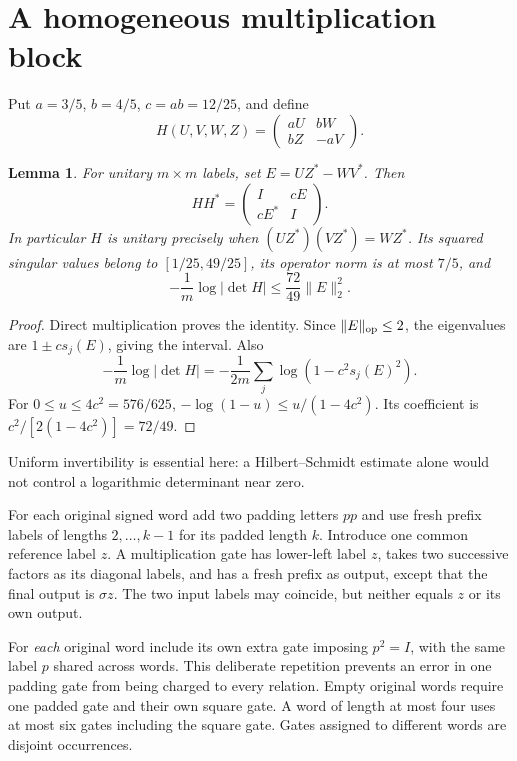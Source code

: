 \documentclass[11pt,a4paper]{article}
\newtheorem{lemma}[theorem]{Lemma}
\newcommand{\norm}[1]{\lVert#1\rVert}
\begin{document}
\section{A homogeneous multiplication block}
Put $a=3/5$, $b=4/5$, $c=ab=12/25$, and define
\[
 H(U,V,W,Z)=\begin{pmatrix}aU&bW\\bZ&-aV\end{pmatrix}.
\]
\begin{lemma}\label{lem:gate}
For unitary $m\times m$ labels, set $E=UZ^*-WV^*$. Then
\[
 HH^*=\begin{pmatrix}I&cE\\cE^*&I\end{pmatrix}.
\]
In particular $H$ is unitary precisely when
$(UZ^*)(VZ^*)=WZ^*$. Its squared singular values belong to
$[1/25,49/25]$, its operator norm is at most $7/5$, and
\begin{equation}
 -\frac1m\log|\det H|\le\frac{72}{49}\norm E_2^2.        \label{eq:log}
\end{equation}
\end{lemma}
\begin{proof}
Direct multiplication proves the identity. Since $\norm E_{\rm op}\le2$, the eigenvalues are $1\pm c s_j(E)$, giving the interval. Also
\[
 -\frac1m\log|\det H|
   =-\frac1{2m}\sum_j\log(1-c^2s_j(E)^2).
\]
For $0\le u\le4c^2=576/625$, $-\log(1-u)\le u/(1-4c^2)$. Its coefficient is
$c^2/[2(1-4c^2)]=72/49$.
\end{proof}
Uniform invertibility is essential here: a Hilbert--Schmidt estimate alone would not control a logarithmic determinant near zero.

For each original signed word add two padding letters $pp$ and use fresh prefix labels of lengths $2,\ldots,k-1$ for its padded length $k$. Introduce one common reference label $z$. A multiplication gate has lower-left label $z$, takes two successive factors as its diagonal labels, and has a fresh prefix as output, except that the final output is $\sigma z$. The two input labels may coincide, but neither equals $z$ or its own output.

For \emph{each} original word include its own extra gate imposing $p^2=I$, with the same label $p$ shared across words. This deliberate repetition prevents an error in one padding gate from being charged to every relation. Empty original words require one padded gate and their own square gate. A word of length at most four uses at most six gates including the square gate. Gates assigned to different words are disjoint occurrences.
\end{document}

